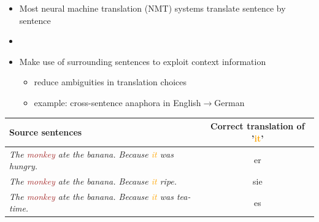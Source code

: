 \documentclass[11pt, a4paper, landscape]{article}
\begin{document}
\TitlePage

%

\NewPage
{}
\hypertarget{sec:motivation}{}
\vfill
\begin{itemize}
  \item Most neural machine translation (NMT) systems translate sentence by sentence
  \item[]
  \item Make use of surrounding sentences to exploit context information
  \begin{itemize}
    \item reduce ambiguities in translation choices
    \item example: cross-sentence anaphora in English$\to$German
  \end{itemize}
\end{itemize}
\vspace*{0.5cm}
\begin{table}
  {\bf 
 	\begin{center}
 		\begin{tabular}{l||c}
 			Source sentences & Correct translation of '\textcolor{orange}{it}' \\
 			\toprule
 			\textit{The \textcolor{brown}{monkey} ate the \textcolor{myyellow}{banana}. Because \textcolor{orange}{it} was hungry.} & \textup{er} \\
 			\textit{The \textcolor{brown}{monkey} ate the \textcolor{myyellow}{banana}. Because \textcolor{orange}{it} ripe.} & \textup{sie} \\
 			\textit{The \textcolor{brown}{monkey} ate the \textcolor{myyellow}{banana}. Because \textcolor{orange}{it} was tea-time.} & \textup{es}
 		\end{tabular}
 	\end{center}
  }
\end{table}
\vfill
\end{document}
